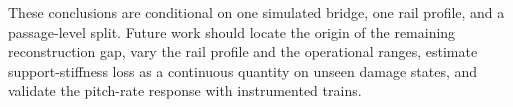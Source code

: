 These conclusions are conditional on one simulated bridge, one rail profile,
and a passage-level split. Future work should locate the origin of the
remaining reconstruction gap, vary the rail profile and the operational ranges,
estimate support-stiffness loss
as a continuous quantity on unseen damage states, and validate the pitch-rate
response with instrumented trains.
